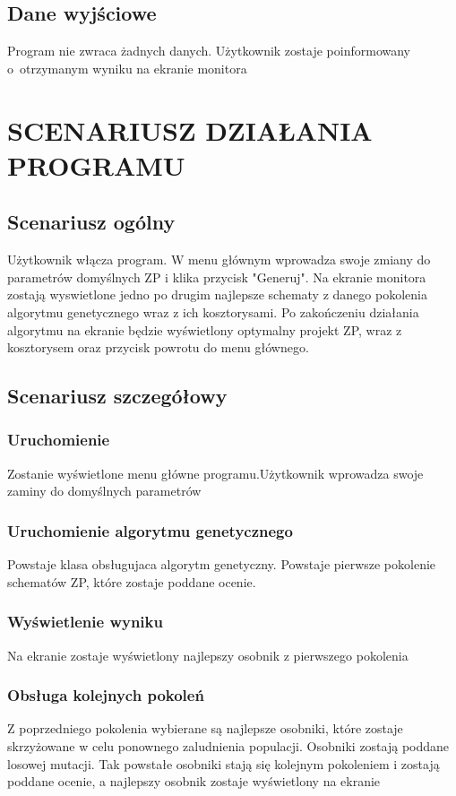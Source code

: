 \documentclass{article}
\begin{document}
\subsection{Dane wyj\'sciowe}
Program nie zwraca \.zadnych danych. U\.zytkownik zostaje poinformowany o~otrzymanym wyniku na ekranie monitora\par

\section{SCENARIUSZ DZIA\L{}ANIA PROGRAMU}

\subsection{Scenariusz og\'olny}
U\.zytkownik w\l{}\k{a}cza program. W menu głównym wprowadza swoje zmiany do parametrów domyślnych ZP i klika przycisk "Generuj". Na ekranie monitora zostają wyswietlone jedno po drugim najlepsze schematy z danego pokolenia algorytmu genetycznego wraz z ich kosztorysami. Po zakończeniu działania algorytmu na ekranie będzie wyświetlony optymalny projekt ZP, wraz z kosztorysem oraz przycisk powrotu do menu głównego.
\par

\subsection{Scenariusz szczeg\'o\l{}owy}
\subsubsection{Uruchomienie}
Zostanie wy\'swietlone menu g\l{}\'owne programu.Użytkownik wprowadza swoje zaminy do domyślnych parametrów
\subsubsection{Uruchomienie algorytmu genetycznego}
Powstaje klasa obsługujaca algorytm genetyczny. Powstaje pierwsze pokolenie schematów ZP, które zostaje poddane ocenie.\par
\subsubsection{Wyświetlenie wyniku}
Na ekranie zostaje wyświetlony najlepszy osobnik z pierwszego pokolenia \par
\subsubsection{Obsługa kolejnych pokoleń}
Z poprzedniego pokolenia wybierane są najlepsze osobniki, które zostaje skrzyżowane w celu ponownego zaludnienia populacji. Osobniki zostają poddane losowej mutacji. Tak powstałe osobniki stają się kolejnym pokoleniem i zostają poddane ocenie, a najlepszy osobnik zostaje wyświetlony na ekranie \par
\end{document}
